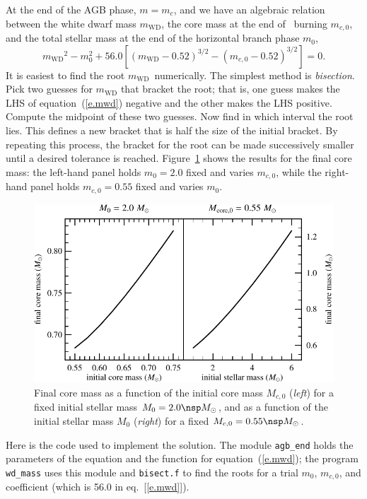 \documentclass[11pt]{article}
\newcommand{\mwd}{\ensuremath{m_{\mathrm{WD}}}}
\begin{document}
At the end of the AGB phase, $m = m_{c}$, and we have an algebraic relation between the white dwarf mass $\mwd$, the core mass at the end of \helium\ burning $m_{c,0}$, and the total stellar mass at the end of the horizontal branch phase $m_{0}$,
\begin{equation}\label{e.mwd}
\mwd^{2} - m_{0}^{2} + 56.0\left[\left(\mwd-0.52\right)^{3/2} - \left(m_{c,0}-0.52\right)^{3/2}\right] = 0.
\end{equation}
It is easiest to find the root \mwd\ numerically. The simplest method is \emph{bisection}.  Pick two guesses for $\mwd$ that bracket the root; that is, one guess makes the LHS of equation~(\ref{e.mwd}) negative and the other makes the LHS positive.  Compute the midpoint of these two guesses.  Now find in which interval the root lies.  This defines a new bracket that is half the size of the initial bracket. By repeating this process, the bracket for the root can be made successively smaller until a desired tolerance is reached.  Figure~\ref{f.core-mass} shows the results for the final core mass: the left-hand panel holds $m_{0} = 2.0$ fixed and varies $m_{c,0}$, while the right-hand panel holds $m_{c,0} = 0.55$ fixed and varies $m_{0}$.

\begin{figure}[htbp]
\includegraphics[width=5in]{plots_out/core_mass_combined}
\caption{Final core mass as a function of the initial core mass $M_{c,0}$ (\emph{left}) for  a fixed initial stellar mass $M_{0} = 2.0\nsp\Msun$, and as a function of the initial stellar mass $M_{0}$ (\emph{right}) for a fixed $M_{c,0}=0.55\nsp\Msun$.\label{f.core-mass}}
\end{figure}
\clearpage

Here is the code used to implement the solution.  The module \verb|agb_end| holds the parameters of the equation and the function for equation~(\ref{e.mwd}); the program \verb|wd_mass| uses this module and \verb|bisect.f| to find the roots for a trial $m_{0}$, $m_{c,0}$, and coefficient (which is 56.0 in eq.~[\ref{e.mwd}]).
\end{document}
